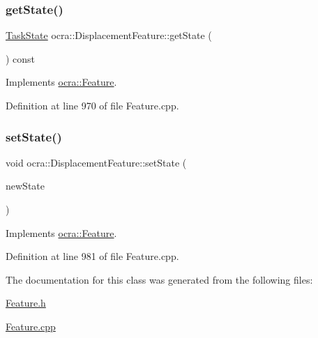 \subsubsection{\texorpdfstring{get\+State()}{getState()}}
{\footnotesize\ttfamily \hyperlink{classocra_1_1TaskState}{Task\+State} ocra\+::\+Displacement\+Feature\+::get\+State (\begin{DoxyParamCaption}{ }\end{DoxyParamCaption}) const\hspace{0.3cm}{\ttfamily [virtual]}}



Implements \hyperlink{classocra_1_1Feature_a792434ceb793f25874b8fe42ae24c475}{ocra\+::\+Feature}.



Definition at line 970 of file Feature.\+cpp.

\hypertarget{classocra_1_1DisplacementFeature_a7a99c7e57d512ec2d6094fc10388e033}{}\label{classocra_1_1DisplacementFeature_a7a99c7e57d512ec2d6094fc10388e033} 
\subsubsection{\texorpdfstring{set\+State()}{setState()}}
{\footnotesize\ttfamily void ocra\+::\+Displacement\+Feature\+::set\+State (\begin{DoxyParamCaption}\item[{const \hyperlink{classocra_1_1TaskState}{Task\+State} \&}]{new\+State }\end{DoxyParamCaption})\hspace{0.3cm}{\ttfamily [virtual]}}



Implements \hyperlink{classocra_1_1Feature_ad16d6b176b229280649ab405531e9a30}{ocra\+::\+Feature}.



Definition at line 981 of file Feature.\+cpp.



The documentation for this class was generated from the following files\+:\begin{DoxyCompactItemize}
\item 
\hyperlink{Feature_8h}{Feature.\+h}\item 
\hyperlink{Feature_8cpp}{Feature.\+cpp}\end{DoxyCompactItemize}
